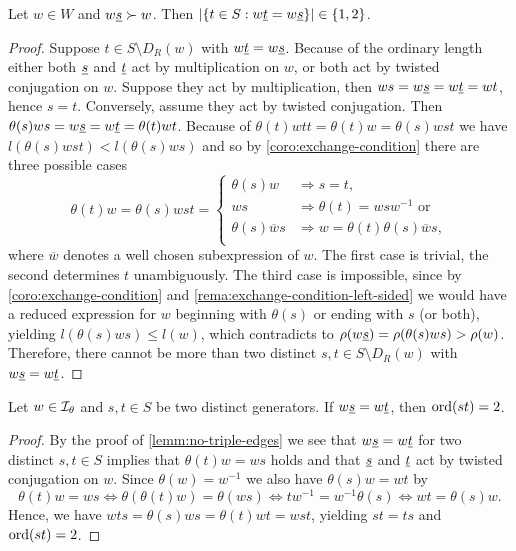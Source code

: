 \begin{lemm}
	Let $w \in W$ and $w \underline{s} \succ w$. Then $|\{ t \in S : w \underline{t} = w \underline{s} \}| \in \{1,2\}$.

	\begin{proof}
		Suppose $t \in S \setminus D_R(w)$ with $w \underline{t} = w \underline{s}$. Because of the ordinary length either both $\underline{s}$ and $\underline{t}$ act by multiplication on $w$, or both act by twisted conjugation on $w$. Suppose they act by multiplication, then $ws = w \underline{s} = w \underline{t} = wt$, hence $s = t$. Conversely, assume they act by twisted conjugation. Then $\theta(s) w s = w \underline{s} = w \underline{t} = \theta(t)wt$. Because of $\theta(t) w t t = \theta(t) w = \theta(s) w s t$ we have $l(\theta(s) w s t) < l(\theta(s) w s)$ and so by \ref{coro:exchange-condition} there are three possible cases
		$$ \theta(t)w = \theta(s) w s t = \begin{cases}
			\theta(s) w & \Rightarrow s = t, \\
			w s & \Rightarrow \theta(t) = w s w^{-1} \textrm{ or} \\
			\theta(s) \overline w s & \Rightarrow w = \theta(t) \theta(s) \overline w s, \\
		\end{cases} $$
		where $\overline w$ denotes a well chosen subexpression of $w$. The first case is trivial, the second determines $t$ unambiguously. The third case is impossible, since by \ref{coro:exchange-condition} and \ref{rema:exchange-condition-left-sided} we would have a reduced expression for $w$ beginning with $\theta(s)$ or ending with $s$ (or both), yielding $l(\theta(s)ws) \leq l(w)$, which contradicts to $\rho(w \underline{s}) = \rho(\theta(s)ws) > \rho(w)$. Therefore, there cannot be more than two distinct $s,t \in S \setminus D_R(w)$ with $w \underline{s} = w \underline{t}$.
	\end{proof}
\end{lemm}

\begin{lemm}
	Let $w \in \mathcal{I}_{\theta}$ and $s,t \in S$ be two distinct generators. If $w \underline{s} = w \underline{t}$, then $\operatorname{ord}(st) = 2$.

	\begin{proof}
		By the proof of \ref{lemm:no-triple-edges} we see that $w \underline{s} = w \underline{t}$ for two distinct $s,t \in S$ implies that $\theta(t)w = ws$ holds and that $\underline{s}$ and $\underline{t}$ act by twisted conjugation on $w$. Since $\theta(w) = w^{-1}$ we also have $\theta(s)w = wt$ by
		$$ \theta(t)w = ws \iff \theta(\theta(t)w) = \theta(ws) \iff tw^{-1} = w^{-1} \theta(s) \iff wt = \theta(s)w. $$
		Hence, we have $wts = \theta(s)ws = \theta(t)wt = wst$, yielding $st = ts$ and $\operatorname{ord}(st) = 2$.
	\end{proof}
\end{lemm}
